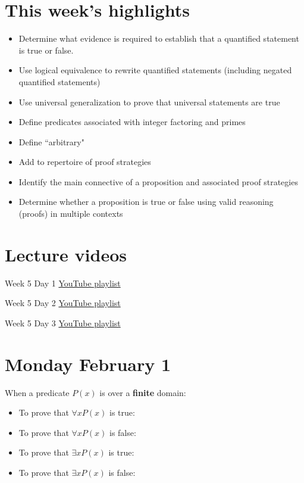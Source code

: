 \documentclass[12pt, oneside]{article}
\begin{document}
\begin{flushright}
\end{flushright}

\section*{This week's highlights}
\begin{itemize}
\item Determine what evidence is required to establish that a quantified statement is true or false.
\item Use logical equivalence to rewrite quantified statements (including negated quantified statements)
\item Use universal generalization to prove that universal statements are true
\item Define predicates associated with integer factoring and primes
\item Define ``arbitrary"
\item Add to repertoire of proof strategies
\item Identify the main connective of a proposition and associated proof strategies
\item Determine whether a proposition is true or false using valid reasoning (proofs) in multiple contexts
\end{itemize}

\section*{Lecture videos}
Week 5 Day 1
\href{https://youtube.com/playlist?list=PLML4QilACLk6mhPkI6360G-jsgYetoTN1}{YouTube playlist}

Week 5 Day 2
\href{https://youtube.com/playlist?list=PLML4QilACLk7ooxYgPtpZWI-5UULS5sfm}{YouTube playlist}

Week 5 Day 3
\href{https://youtube.com/playlist?list=PLML4QilACLk5N_Byc5vp3qZrK1L-7CTCW}{YouTube playlist}

\newpage
\section*{Monday February 1}


When a predicate $P(x)$ is over a {\bf finite} domain:
\begin{itemize}
\item To prove that $\forall x  P(x)$ is true: \underline{\phantom{\hspace{4.6in}}}
\item To prove that $\forall x  P(x)$ is false: \underline{\phantom{\hspace{4.6in}}}
\item To prove that $\exists x  P(x)$ is true: \underline{\phantom{\hspace{4.6in}}}
\item To prove that $\exists x  P(x)$ is false: \underline{\phantom{\hspace{4.6in}}}
\end{itemize}
\end{document}
